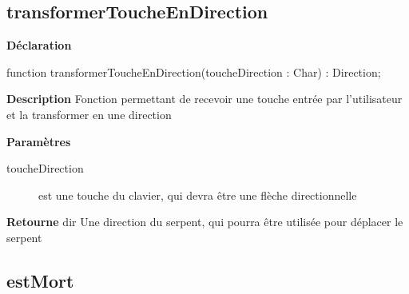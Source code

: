 \documentclass{report}
\newif\ifpdf
\begin{document}
\subsection*{transformerToucheEnDirection}
\fi
\label{Jouer-transformerToucheEnDirection}
\begin{list}{}{
\setlength{\itemindent}{0cm}
\setlength{\listparindent}{0cm}
\setlength{\leftmargin}{\evensidemargin}
\addtolength{\leftmargin}{\tmplength}
\settowidth{\labelsep}{X}
\addtolength{\leftmargin}{\labelsep}
\setlength{\labelwidth}{\tmplength}
}
\item[\textbf{Déclaration}\hfill]
\ifpdf
\begin{flushleft}
\fi
\begin{ttfamily}
function transformerToucheEnDirection(toucheDirection : Char) : Direction;\end{ttfamily}

\ifpdf
\end{flushleft}
\fi

\par
\item[\textbf{Description}]
Fonction permettant de recevoir une touche entrée par l'utilisateur et la transformer en une direction  \par
\item[\textbf{Paramètres}]
\begin{description}
\item[toucheDirection] est une touche du clavier, qui devra être une flèche directionnelle
\end{description}
\item[\textbf{Retourne}]dir Une direction du serpent, qui pourra être utilisée pour déplacer le serpent


\end{list}
\ifpdf
\subsection*{\large{\textbf{estMort}}\normalsize\hspace{1ex}\hrulefill}
\else
\end{document}
